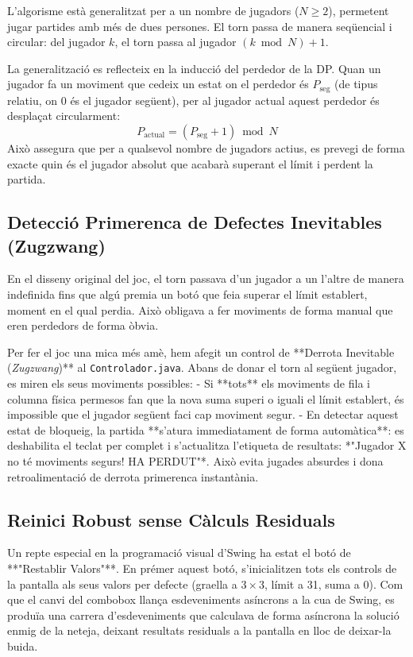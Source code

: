 \documentclass[compsoc, a4paper]{IEEEtran}
\begin{document}
L'algorisme està generalitzat per a un nombre de jugadors ($N \ge 2$), permetent jugar partides amb més de dues persones. El torn passa de manera seqüencial i circular: del jugador $k$, el torn passa al jugador $(k \bmod N) + 1$. 

La generalització es reflecteix en la inducció del perdedor de la DP. Quan un jugador fa un moviment que cedeix un estat on el perdedor és $P_{\text{seg}}$ (de tipus relatiu, on $0$ és el jugador següent), per al jugador actual aquest perdedor és desplaçat circularment:
$$P_{\text{actual}} = (P_{\text{seg}} + 1) \bmod N$$
Això assegura que per a qualsevol nombre de jugadors actius, es prevegi de forma exacte quin és el jugador absolut que acabarà superant el límit i perdent la partida.

\subsection{Detecció Primerenca de Defectes Inevitables (Zugzwang)}

En el disseny original del joc, el torn passava d'un jugador a un l'altre de manera indefinida fins que algú premia un botó que feia superar el límit establert, moment en el qual perdia. Això obligava a fer moviments de forma manual que eren perdedors de forma òbvia.

Per fer el joc una mica més amè, hem afegit un control de **Derrota Inevitable (\textit{Zugzwang})** al \texttt{Controlador.java}. Abans de donar el torn al següent jugador, es miren els seus moviments possibles:
- Si **tots** els moviments de fila i columna física permesos fan que la nova suma superi o iguali el límit establert, és impossible que el jugador següent faci cap moviment segur.
- En detectar aquest estat de bloqueig, la partida **s'atura immediatament de forma automàtica**: es deshabilita el teclat per complet i s'actualitza l'etiqueta de resultats: *"Jugador X no té moviments segurs! HA PERDUT"*. 
Això evita jugades absurdes i dona retroalimentació de derrota primerenca instantània.

\subsection{Reinici Robust sense Càlculs Residuals}

Un repte especial en la programació visual d'Swing ha estat el botó de **"Restablir Valors"**. En prémer aquest botó, s'inicialitzen tots els controls de la pantalla als seus valors per defecte (graella a $3 \times 3$, límit a 31, suma a 0). Com que el canvi del combobox llança esdeveniments asíncrons a la cua de Swing, es produïa una carrera d'esdeveniments que calculava de forma asíncrona la solució enmig de la neteja, deixant resultats residuals a la pantalla en lloc de deixar-la buida.
\end{document}

